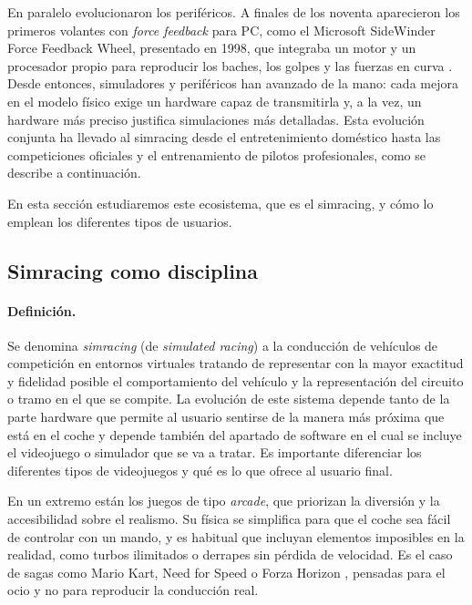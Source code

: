 En paralelo evolucionaron los periféricos. A finales de los noventa aparecieron los primeros volantes con \textit{force feedback} para PC, como el Microsoft SideWinder Force Feedback Wheel, presentado en 1998, que integraba un motor y un procesador propio para reproducir los baches, los golpes y las fuerzas en curva \parencite{microsoft_sidewinder_1998}. Desde entonces, simuladores y periféricos han avanzado de la mano: cada mejora en el modelo físico exige un hardware capaz de transmitirla y, a la vez, un hardware más preciso justifica simulaciones más detalladas. Esta evolución conjunta ha llevado al simracing desde el entretenimiento doméstico hasta las competiciones oficiales y el entrenamiento de pilotos profesionales, como se describe a continuación.

En esta sección estudiaremos este ecosistema, que es el simracing, y cómo lo emplean los diferentes tipos de usuarios.


\subsection{Simracing como disciplina}
\label{sec:simracing-mercado}

\paragraph{Definición.}
Se denomina \textit{simracing} (de \textit{simulated racing}) a la conducción de vehículos de competición en entornos virtuales tratando de representar con la mayor exactitud y fidelidad posible el comportamiento del vehículo y la representación del circuito o tramo en el que se compite. La evolución de este sistema depende tanto de la parte hardware que permite al usuario sentirse de la manera más próxima que está en el coche y depende también del apartado de software en el cual se incluye el videojuego o simulador que se va a tratar. Es importante diferenciar los diferentes tipos de videojuegos y qué es lo que ofrece al usuario final.

En un extremo están los juegos de tipo \textit{arcade}, que priorizan la diversión y la accesibilidad sobre el realismo. Su física se simplifica para que el coche sea fácil de controlar con un mando, y es habitual que incluyan elementos imposibles en la realidad, como turbos ilimitados o derrapes sin pérdida de velocidad. Es el caso de sagas como Mario Kart, Need for Speed o Forza Horizon \parencite{ruscio_2017_racing_realism}, pensadas para el ocio y no para reproducir la conducción real.


